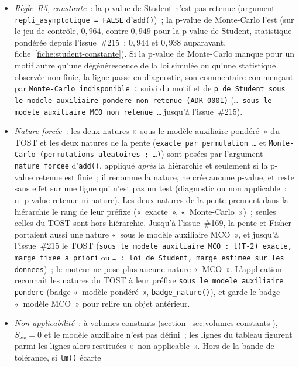 \documentclass[a4paper,11pt]{article}
\newcommand{\code}[1]{\texttt{\small #1}}
\begin{document}
\begin{itemize}[itemsep=1pt]
  unilatéral, $1{,}856$ en bilatéral, à $\alpha = 0{,}10$)~: le classement test / diagnostic de la
  ligne y dépend du sens, non son verdict (fiche~\ref{fiche:student-pente}, rubrique~6~;
  issue~\#218).
  \item \emph{Règle~R5, constante}~: la p-value de Student n'est pas retenue (argument
  \code{repli\_asymptotique = FALSE} d'\code{add()})~; la p-value de Monte-Carlo l'est (sur le jeu
  de contrôle, $0{,}964$, contre $0{,}949$ pour la p-value de Student, statistique pondérée
  depuis l'issue~\#215~; $0{,}944$ et $0{,}938$ auparavant, fiche~\ref{fiche:student-constante}).
  Si la p-value de Monte-Carlo manque pour un motif autre
  qu'une dégénérescence de la loi simulée ou qu'une statistique observée non finie, la ligne passe
  en diagnostic, son commentaire commençant
  par \code{Monte-Carlo indisponible :} suivi du motif et de \code{p de Student sous le modele
  auxiliaire pondere non retenue (ADR 0001)} (\code{\dots{} sous le modele auxiliaire MCO non retenue \dots} jusqu'à l'issue~\#215).
  \item \emph{Nature forcée}~: les deux natures «~sous le modèle auxiliaire pondéré~» du TOST et les
  deux natures de la pente (\code{exacte par permutation \dots} et \code{Monte-Carlo
  (permutations aleatoires ; \dots)}) sont posées par l'argument \code{nature\_forcee}
  d'\code{add()}, appliqué \emph{après} la hiérarchie et seulement si la p-value retenue est
  finie~; il renomme la nature, ne crée aucune p-value, et reste sans effet sur une ligne qui n'est
  pas un test (diagnostic ou non applicable~: ni p-value retenue ni nature). Les deux natures de la
  pente prennent dans la hiérarchie le rang de leur préfixe («~exacte~», «~Monte-Carlo~»)~; seules
  celles du TOST sont hors hiérarchie. Jusqu'à l'issue~\#169, la pente et Fisher portaient aussi
  une nature «~sous le modèle auxiliaire MCO~», et jusqu'à l'issue~\#215 le TOST (\code{sous le
  modele auxiliaire MCO : t(T-2) exacte, marge fixee a priori} ou \code{\dots{} : loi de Student,
  marge estimee sur les donnees})~; le moteur ne pose plus aucune nature «~MCO~».
  L'application reconnaît les natures du TOST à leur préfixe \code{sous le modele auxiliaire
  pondere} (badge «~modèle pondéré~», \code{badge\_nature()}), et garde le badge «~modèle MCO~»
  pour relire un objet antérieur.
  \item \emph{Non applicabilité}~: à volumes constants (section~\ref{sec:volumes-constants}),
  $S_{xx} = 0$ et le modèle auxiliaire n'est pas défini~; les lignes du tableau figurent parmi les
  lignes alors restituées «~non applicable~». Hors de la bande de tolérance, si \code{lm()} écarte

\end{itemize}
\end{document}
